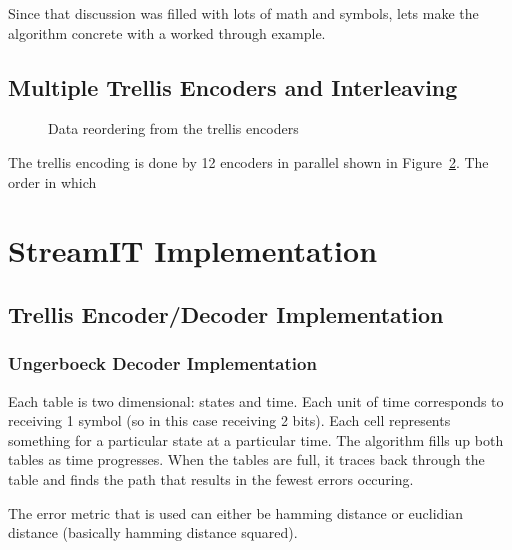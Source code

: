 \documentclass{article}
\begin{document}
Since that discussion was filled with lots of math and symbols, 
lets make the algorithm concrete with a worked through example.




\subsection{Multiple Trellis Encoders and Interleaving}

\begin{figure}
\center
\epsfxsize=5.5in
\caption{}
\label{fig:multiple-trellis}
\end{figure}

\begin{figure}
\center
\epsfxsize=5.5in
\caption{Data reordering from the trellis encoders}
\label{fig:trellis-interleaving}
\end{figure}


The trellis encoding is done by 12 encoders in parallel shown in
Figure~\ref{fig:trellis-interleaving}. The
order in which 






\section{StreamIT Implementation}


\subsection{Trellis Encoder/Decoder Implementation}

\subsubsection{Ungerboeck Decoder Implementation}
Each table is two dimensional: states and time. Each unit of time corresponds to
receiving 1 symbol (so in this case receiving 2 bits). Each cell represents something
for a particular state at a particular time. The algorithm fills up both tables as
time progresses. When the tables are full, it traces back through the table and finds the
path that results in the fewest errors occuring.

The error metric that is used can either be hamming distance or euclidian distance (basically
hamming distance squared).
\end{document}

